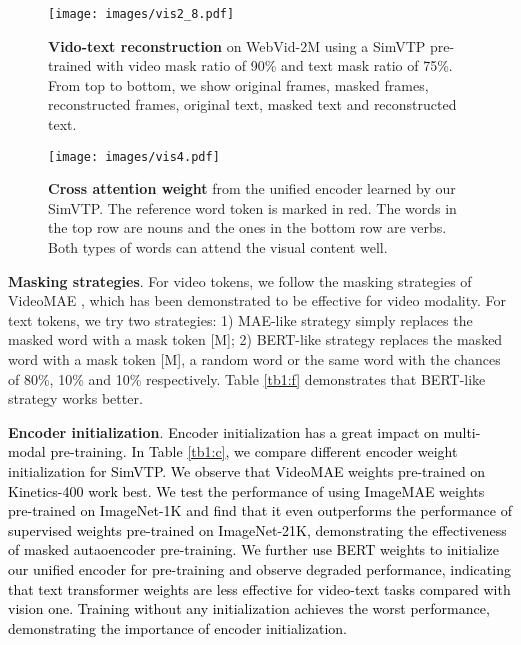 \documentclass[10pt,twocolumn,letterpaper]{article}
\newcommand{\yty}[1]{\textcolor{black}{#1}}
\newcommand{\ytyn}[1]{\textcolor{black}{#1}}
\begin{document}
\begin{figure*}[t]
	\centering
	\texttt{[image: images/vis2\_8.pdf]}
	\caption{\textbf{Vido-text reconstruction} on WebVid-2M using a SimVTP pre-trained with video mask ratio of 90\% and text mask ratio of 75\%. From top to bottom, we show original frames, masked frames, reconstructed frames, original text, masked text and reconstructed text.}\label{fig:rec}
\end{figure*}

\begin{figure*}[t]
	\centering
	\texttt{[image: images/vis4.pdf]}
	\caption{\textbf{Cross attention weight} from the unified encoder learned by our SimVTP. The reference word token is marked in red. The words in the top row are nouns and the ones in the bottom row are verbs. Both types of words can attend the visual content well.}
	\label{fig:attention}
\end{figure*}

\noindent\textbf{Masking strategies}. For video tokens, we follow the masking strategies of VideoMAE \cite{tong2022videomae}, which has been demonstrated to be effective for video modality.  For text tokens, we try two strategies: 1) MAE-like strategy simply replaces the masked word with a mask token [M]; 2) BERT-like strategy replaces the masked word with a mask token [M], a random word or the same word with the chances of 80\%, 10\% and 10\% respectively.  Table \ref{tb1:f} demonstrates that BERT-like strategy works better.

\noindent\textbf{Encoder initialization}.
\yty{Encoder initialization has a great impact on multi-modal pre-training. In Table \ref{tb1:c}, we compare different encoder weight initialization for SimVTP. We observe that VideoMAE weights pre-trained on Kinetics-400 work best. 
We test the performance of using ImageMAE weights pre-trained on ImageNet-1K and find that it even outperforms the performance of supervised weights pre-trained on ImageNet-21K, demonstrating the effectiveness of masked autaoencoder pre-training. \ytyn{We further use BERT weights to initialize our unified encoder for pre-training and observe degraded performance, indicating that text transformer weights are less effective for video-text tasks compared with vision one. Training without any initialization achieves the worst performance, demonstrating the importance of encoder initialization.}}
\end{document}
